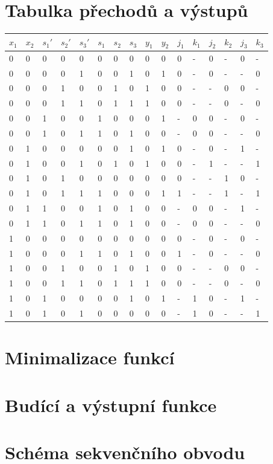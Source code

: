 \documentclass[titlepage]{article}
\begin{document}
\section{Tabulka přechodů a výstupů}
\begin{center}
\begin{tabular}{|l|l|l|l|l|l|l|l|l|l|l|l|l|l|l|l|}
\hline
{\bf $x_1$} & {\bf $x_2$} & {\bf $s_1'$} & {\bf $s_2'$} & {\bf $s_3'$} & {\bf
$s_1$} & {\bf $s_2$} & {\bf $s_3$} & {\bf $y_1$} & {\bf $y_2$} & {\bf $j_1$} & {\bf $k_1$} & {\bf $j_2$} & {\bf $k_2$} & {\bf $j_3$} & {\bf $k_3$}\\
\hline
0 & 0 & 0 & 0 & 0 & 0 & 0 & 0 & 0 & 0 & 0 & - & 0 & - & 0 & - \\
0 & 0 & 0 & 0 & 1 & 0 & 0 & 1 & 0 & 1 & 0 & - & 0 & - & - & 0 \\
0 & 0 & 0 & 1 & 0 & 0 & 1 & 0 & 1 & 0 & 0 & - & - & 0 & 0 & - \\
0 & 0 & 0 & 1 & 1 & 0 & 1 & 1 & 1 & 0 & 0 & - & - & 0 & - & 0 \\
0 & 0 & 1 & 0 & 0 & 1 & 0 & 0 & 0 & 1 & - & 0 & 0 & - & 0 & - \\
0 & 0 & 1 & 0 & 1 & 1 & 0 & 1 & 0 & 0 & - & 0 & 0 & - & - & 0 \\
0 & 1 & 0 & 0 & 0 & 0 & 0 & 1 & 0 & 1 & 0 & - & 0 & - & 1 & - \\
0 & 1 & 0 & 0 & 1 & 0 & 1 & 0 & 1 & 0 & 0 & - & 1 & - & - & 1 \\
0 & 1 & 0 & 1 & 0 & 0 & 0 & 0 & 0 & 0 & 0 & - & - & 1 & 0 & - \\
0 & 1 & 0 & 1 & 1 & 1 & 0 & 0 & 0 & 1 & 1 & - & - & 1 & - & 1 \\
0 & 1 & 1 & 0 & 0 & 1 & 0 & 1 & 0 & 0 & - & 0 & 0 & - & 1 & - \\
0 & 1 & 1 & 0 & 1 & 1 & 0 & 1 & 0 & 0 & - & 0 & 0 & - & - & 0 \\
1 & 0 & 0 & 0 & 0 & 0 & 0 & 0 & 0 & 0 & 0 & - & 0 & - & 0 & - \\
1 & 0 & 0 & 0 & 1 & 1 & 0 & 1 & 0 & 0 & 1 & - & 0 & - & - & 0 \\
1 & 0 & 0 & 1 & 0 & 0 & 1 & 0 & 1 & 0 & 0 & - & - & 0 & 0 & - \\
1 & 0 & 0 & 1 & 1 & 0 & 1 & 1 & 1 & 0 & 0 & - & - & 0 & - & 0 \\
1 & 0 & 1 & 0 & 0 & 0 & 0 & 1 & 0 & 1 & - & 1 & 0 & - & 1 & - \\
1 & 0 & 1 & 0 & 1 & 0 & 0 & 0 & 0 & 0 & - & 1 & 0 & - & - & 1 \\
\hline
\end{tabular}
\end{center}
\section{Minimalizace funkcí}
\section{Budící a výstupní funkce}
\section{Schéma sekvenčního obvodu}
\end{document}

